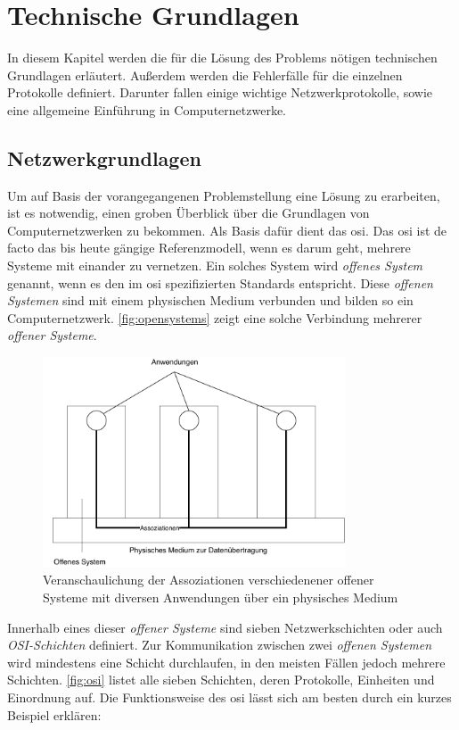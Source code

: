 \documentclass[titlepage]{report}
\begin{document}
\chapter*{Technische Grundlagen}
In diesem Kapitel werden die für die Lösung des Problems nötigen
technischen Grundlagen erläutert. Außerdem werden die Fehlerfälle für
die einzelnen Protokolle definiert. Darunter fallen einige wichtige
Netzwerkprotokolle, sowie eine allgemeine Einführung in
Computernetzwerke.
\section*{Netzwerkgrundlagen}
Um auf Basis der vorangegangenen Problemstellung eine Lösung zu
erarbeiten, ist es notwendig, einen groben Überblick über die Grundlagen
von Computernetzwerken zu bekommen. Als Basis dafür dient das \gls{osi}. Das
\gls{osi} ist de facto das bis heute gängige Referenzmodell, wenn es
darum geht, mehrere Systeme mit einander zu vernetzen. Ein solches System
wird \emph{offenes System} genannt, wenn es den im \gls{osi}
spezifizierten Standards entspricht\cite[Siehe Abschnitt
4.1.2]{ITUOSI}. Diese \emph{offenen Systemen} sind mit einem physischen
Medium verbunden und bilden so ein Computernetzwerk. \autoref{fig:opensystems}
zeigt eine solche Verbindung mehrerer \emph{offener Systeme}.
\begin{figure}[H]
    \centering
    \includegraphics[width=0.8\textwidth]{figures/open_systems.pdf}
    \caption{Veranschaulichung der Assoziationen verschiedenener offener
    Systeme mit diversen Anwendungen über ein physisches Medium}\label{fig:opensystems}
\end{figure}
Innerhalb eines dieser \emph{offener Systeme} sind sieben
Netzwerkschichten oder auch \emph{OSI-Schichten} definiert\cite[Siehe
Abschnitt 6.1.2]{ITUOSI}. Zur
Kommunikation zwischen zwei \emph{offenen Systemen} wird mindestens eine
Schicht durchlaufen, in den meisten Fällen jedoch mehrere Schichten.
\autoref{fig:osi} listet alle sieben Schichten, deren Protokolle,
Einheiten und Einordnung auf. Die Funktionsweise des \gls{osi} lässt
sich am besten durch ein kurzes Beispiel erklären:
\end{document}
